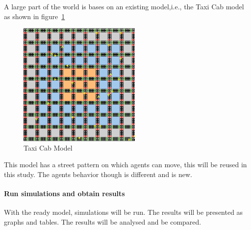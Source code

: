 A large part of the world is bases on an existing model,i.e., the Taxi Cab model~\cite{dongpingtaxicabs2019} as shown in figure~\ref{fig:taxi cab}
\begin{figure}
    \centering
    \includegraphics[width=6cm]{sections/pics/Taxi Cabs}
    \caption{Taxi Cab Model}
    \label{fig:taxi cab}
\end{figure}

This model has a street pattern on which agents can move, this will be reused in this study.
The agents behavior though is different and is new.


\paragraph{Run simulations and obtain results}
With the ready model, simulations will be run.
The results will be presented as graphs and tables.
The results will be analysed and be compared.







